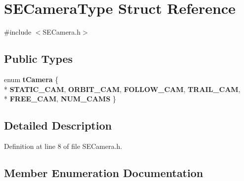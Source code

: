 \section{S\+E\+Camera\+Type Struct Reference}
\label{struct_s_e_camera_type}


{\ttfamily \#include $<$S\+E\+Camera.\+h$>$}

\subsection*{Public Types}
\begin{DoxyCompactItemize}
\item 
enum {\bf t\+Camera} \{ \\*
{\bf S\+T\+A\+T\+I\+C\+\_\+\+C\+A\+M}, 
{\bf O\+R\+B\+I\+T\+\_\+\+C\+A\+M}, 
{\bf F\+O\+L\+L\+O\+W\+\_\+\+C\+A\+M}, 
{\bf T\+R\+A\+I\+L\+\_\+\+C\+A\+M}, 
\\*
{\bf F\+R\+E\+E\+\_\+\+C\+A\+M}, 
{\bf N\+U\+M\+\_\+\+C\+A\+M\+S}
 \}
\end{DoxyCompactItemize}


\subsection{Detailed Description}


Definition at line 8 of file S\+E\+Camera.\+h.



\subsection{Member Enumeration Documentation}

